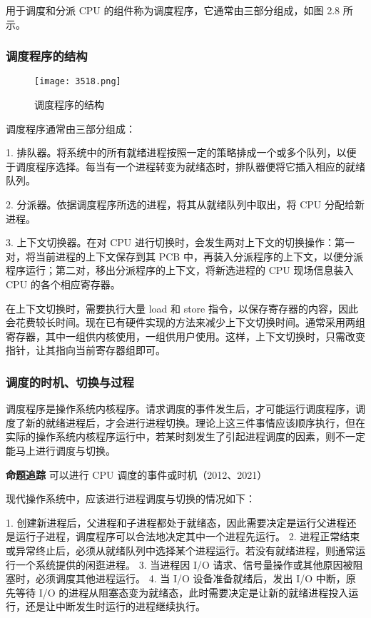 \documentclass{ctexbook}
\begin{document}
	用于调度和分派 CPU 的组件称为调度程序，它通常由三部分组成，如图 2.8 所示。
	
	\subsubsection{调度程序的结构}
	
	\begin{figure}[h]
		\centering
		\texttt{[image: 3518.png]}
		\caption{调度程序的结构}
		\label{fig:scheduler_structure}
	\end{figure}
	
	调度程序通常由三部分组成：
	
	1. 排队器。将系统中的所有就绪进程按照一定的策略排成一个或多个队列，以便于调度程序选择。每当有一个进程转变为就绪态时，排队器便将它插入相应的就绪队列。
	
	2. 分派器。依据调度程序所选的进程，将其从就绪队列中取出，将 CPU 分配给新进程。
	
	3. 上下文切换器。在对 CPU 进行切换时，会发生两对上下文的切换操作：第一对，将当前进程的上下文保存到其 PCB 中，再装入分派程序的上下文，以便分派程序运行；第二对，移出分派程序的上下文，将新选进程的 CPU 现场信息装入 CPU 的各个相应寄存器。
	
	在上下文切换时，需要执行大量 load 和 store 指令，以保存寄存器的内容，因此会花费较长时间。现在已有硬件实现的方法来减少上下文切换时间。通常采用两组寄存器，其中一组供内核使用，一组供用户使用。这样，上下文切换时，只需改变指针，让其指向当前寄存器组即可。
	
	\subsubsection{调度的时机、切换与过程}
	
	调度程序是操作系统内核程序。请求调度的事件发生后，才可能运行调度程序，调度了新的就绪进程后，才会进行进程切换。理论上这三件事情应该顺序执行，但在实际的操作系统内核程序运行中，若某时刻发生了引起进程调度的因素，则不一定能马上进行调度与切换。
	
	\textbf{命题追踪} 可以进行 CPU 调度的事件或时机（2012、2021）
	
	现代操作系统中，应该进行进程调度与切换的情况如下：
	
	1. 创建新进程后，父进程和子进程都处于就绪态，因此需要决定是运行父进程还是运行子进程，调度程序可以合法地决定其中一个进程先运行。
	2. 进程正常结束或异常终止后，必须从就绪队列中选择某个进程运行。若没有就绪进程，则通常运行一个系统提供的闲逛进程。
	3. 当进程因 I/O 请求、信号量操作或其他原因被阻塞时，必须调度其他进程运行。
	4. 当 I/O 设备准备就绪后，发出 I/O 中断，原先等待 I/O 的进程从阻塞态变为就绪态，此时需要决定是让新的就绪进程投入运行，还是让中断发生时运行的进程继续执行。
	
\end{document}
